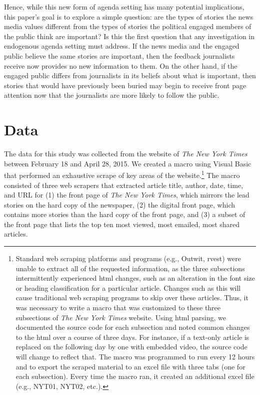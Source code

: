 \documentclass[12pt]{article}
\begin{document}
\begin{doublespace}
Hence, while this new form of agenda setting has many potential implications, this paper's goal is to explore a simple question: are the types of stories the news media values different from the types of stories the political engaged members of the public think are important? Is this the first question that any investigation in endogenous agenda setting must address. If the news media and the engaged public believe the same stories are important, then the feedback journalists receive now provides no new information to them. On the other hand, if the engaged public differs from journalists in its beliefs about what is important, then stories that would have previously been buried may begin to receive front page attention now that the journalists are more likely to follow the public.


\section{Data} 

The data for this study was collected from the website of \textit{The New York Times} between February 18 and April 28, 2015. We created a macro using Visual Basic that performed an exhaustive scrape of key areas of the website.\footnote{Standard web scraping platforms and programs (e.g., Outwit, rvest) were unable to extract all of the requested information, as the three subsections intermittently experienced html changes, such as an alteration in the font size or heading classification for a particular article.  Changes such as this will cause traditional web scraping programs to skip over these articles. Thus, it was necessary to write a macro that was customized to these three subsections of \textit{The New York Times} website. Using html parsing, we documented the source code for each subsection and noted common changes to the html over a course of three days. For instance, if a text-only article is replaced on the following day by one with embedded video, the source code will change to reflect that. The macro was programmed to run every 12 hours and to export the scraped material to an excel file with three tabs (one for each subsection). Every time the macro ran, it created an additional excel file (e.g., NYT01, NYT02, etc.).} The macro consisted of three web scrapers that extracted article title, author, date, time, and URL for (1) the front page of \textit{The New York Times}, which mirrors the lead stories on the hard copy of the newspaper, (2) the digital front page, which contains more stories than the hard copy of the front page, and (3) a subset of the front page that lists the top ten most viewed, most emailed, most shared articles.


\end{doublespace}
\end{document}
